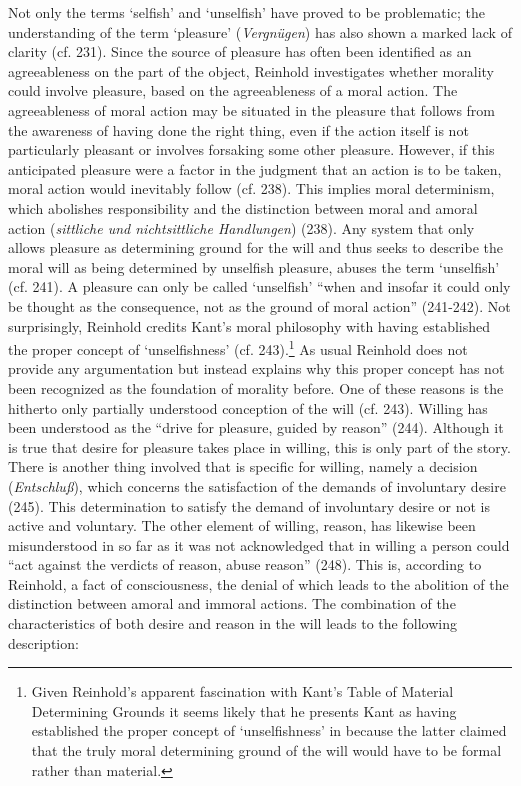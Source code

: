  Not only the terms `selfish' and `unselfish' have proved to be problematic; the understanding of the term `pleasure' (\textit{Vergn\"{u}gen}) has also shown a marked lack of clarity (cf. 231). Since the source of pleasure has often been identified as an agreeableness on the part of the object, Reinhold investigates whether morality could involve pleasure, based on the agreeableness of a moral action. The agreeableness of moral action may be situated in the pleasure that follows from the awareness of having done the right thing, even if the action itself is not particularly pleasant or involves forsaking some other pleasure. However, if this anticipated pleasure were a factor in the judgment that an action is to be taken, moral action would inevitably follow (cf. 238). This implies moral determinism, which abolishes responsibility and the distinction between moral and amoral action (\textit{sittliche und nichtsittliche Handlungen}) (238). Any system that only allows pleasure as determining ground for the will and thus seeks to describe the moral will as being determined by unselfish pleasure, abuses the term `unselfish' (cf. 241). A pleasure can only be called `unselfish' ``when and insofar it could only be thought as the consequence, not as the ground of moral action'' (241{-}242). Not surprisingly, Reinhold credits Kant's moral philosophy with having established the proper concept of `unselfishness' (cf. 243).\footnote{ Given Reinhold's apparent fascination with Kant's Table of Material Determining Grounds it seems likely that he presents Kant as having established the proper concept of `unselfishness' in because the latter claimed that the truly moral determining ground of the will would have to be formal rather than material. } As usual Reinhold does not provide any argumentation but instead explains why this proper concept has not been recognized as the foundation of morality before. One of these reasons is the hitherto only partially understood conception of the will (cf. 243). Willing has been understood as the ``drive for pleasure, guided by reason'' (244). Although it is true that desire for pleasure takes place in willing, this is only part of the story. There is another thing involved that is specific for willing, namely a decision (\textit{Entschlu\ss{}}), which concerns the satisfaction of the demands of involuntary desire (245). This determination to satisfy the demand of involuntary desire or not is active and voluntary. The other element of willing, reason, has likewise been misunderstood in so far as it was not acknowledged that in willing a person could ``act against the verdicts of reason, abuse reason'' (248). This is, according to Reinhold, a fact of consciousness, the denial of which leads to the abolition of the distinction between amoral and immoral actions. The combination of the characteristics of both desire and reason in the will leads to the following description: 

